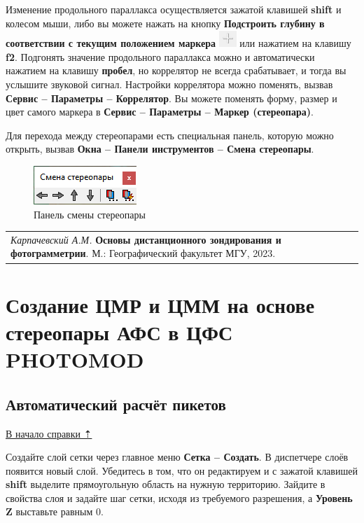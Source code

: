 \documentclass[
  12pt,
]{book}
\begin{document}
Изменение продольного параллакса осуществляется зажатой клавишей \textbf{shift} и колесом мыши, либо вы можете нажать на кнопку \textbf{Подстроить глубину в соответствии с текущим положением маркера} \includegraphics{images/Ref15/Adjust_parallax.png} или нажатием на клавишу \textbf{f2}. Подгонять значение продольного параллакса можно и автоматически нажатием на клавишу \textbf{пробел}, но коррелятор не всегда срабатывает, и тогда вы услышите звуковой сигнал. Настройки коррелятора можно поменять, вызвав \textbf{Сервис -- Параметры -- Коррелятор}. Вы можете поменять форму, размер и цвет самого маркера в \textbf{Сервис -- Параметры -- Маркер (стереопара)}.

Для перехода между стереопарами есть специальная панель, которую можно открыть, вызвав \textbf{Окна -- Панели инструментов -- Смена стереопары}.

\begin{figure}
\centering
\includegraphics{images/Ref15/Change_Stereopair.png}
\caption{Панель смены стереопары}
\end{figure}

\begin{longtable}[]{@{}l@{}}
\toprule\noalign{}
\endhead
\bottomrule\noalign{}
\endlastfoot
\emph{Карпачевский А.М.} \textbf{Основы дистанционного зондирования и фотограмметрии}. М.: Географический факультет МГУ, 2023. \\
\end{longtable}

\hypertarget{photomod_DEM}{%
\chapter{Создание ЦМР и ЦММ на основе стереопары АФС в ЦФС PHOTOMOD}\label{photomod_DEM}}

\hypertarget{photomod_DEM-pikets}{%
\section{Автоматический расчёт пикетов}\label{photomod_DEM-pikets}}

\protect\hyperlink{photomod_DEM}{В начало справки ⇡}

Создайте слой сетки через главное меню \textbf{Сетка -- Создать}. В диспетчере слоёв появится новый слой. Убедитесь в том, что он редактируем и с зажатой клавишей \textbf{shift} выделите прямоугольную область на нужную территорию. Зайдите в свойства слоя и задайте шаг сетки, исходя из требуемого разрешения, а \textbf{Уровень Z} выставьте равным 0.
\end{document}
